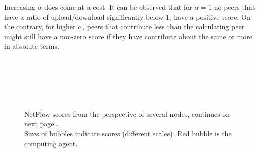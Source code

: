 \documentclass[a4paper,11pt]{book}
\theoremstyle{definition}
\begin{document}
Increasing $\alpha$ does come at a cost. It can be observed that for $\alpha=1$ no peers
that have a ratio of upload/download significantly below $1$, have a positive score. 
On the contrary, for higher $\alpha$, peers that contribute less than the calculating
peer might still have a non-zero score if they have contribute about the same or more
in absolute terms.

\begin{figure}[ht]
    \centering
    \subfloat{}
    \subfloat{}\\
    \addtocounter{subfigure}{-1}
    \addtocounter{subfigure}{-1}

    \subfloat{}
    \subfloat{}\\

    \addtocounter{subfigure}{-1}
    \addtocounter{subfigure}{-1}

    \\
    \caption{NetFlow scores from the perspective of several nodes, continues on next page\dots \\
             Sizes of bubbles indicate scores (different scales). Red bubble is the computing agent.}
    \label{fig:nf_alpha_comparison_1}
\end{figure}
\end{document}
